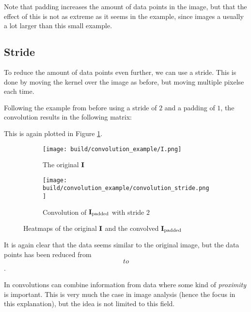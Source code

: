 Note that padding increases the amount of data points in the image, but that
the effect of this is not as extreme as it seems in the example, since images a usually
a lot larger than this small example.

\subsection{Stride}
To reduce the amount of data points even further, we can use a stride.
This is done by moving the kernel over the image as before, but moving multiple pixelse each time.

Following the example from before using a stride of $2$ and a padding of $1$, the convolution results in the following matrix:
\begin{equation}
    
\end{equation}

This is again plotted in Figure \ref{fig:convolution_example_stride}.

\begin{figure}[ht]
    \centering
    \begin{subfigure}{0.45\textwidth}
        \texttt{[image: build/convolution\_example/I.png]}
        \caption{The original $\textbf{I}$}
    \end{subfigure}
    \begin{subfigure}{0.45\textwidth}
        \texttt{[image: build/convolution\_example/convolution\_stride.png]}
        \caption{Convolution of $\textbf{I}_{\text{padded}}$ with stride $2$}
    \end{subfigure}
    \caption{Heatmaps of the original $\textbf{I}$ and the convolved $\textbf{I}_{\text{padded}}$}
    \label{fig:convolution_example_stride}
\end{figure}

It is again clear that the data seems similar to the original image, but the data points
has been reduced from $$ to $$.

In convolutions can combine information from data where some kind of \textit{proximity} is important.
This is very much the case in image analysis (hence the focus in this explanation), but the idea is
not limited to this field.

